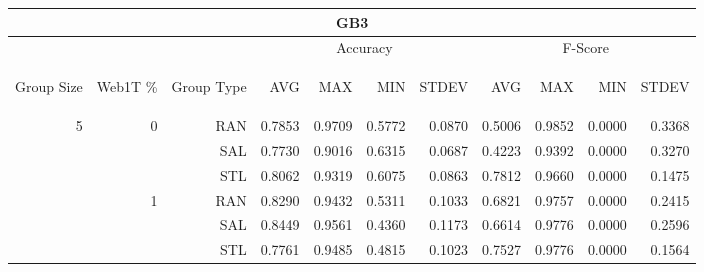 \begin{center}
\begin{table}[htbp] 
 \begin{center}
\begin{tabular}{ | r | r | r | r | r | r | r | r | r | r | r |}
\hline
\multicolumn{11}{|c|}{GB3}\\
\hline
 & & & \multicolumn{4}{|c|}{Accuracy} & \multicolumn{4}{|c|}{F-Score}\\ \cline{4-11}
\begin{sideways}Group Size\end{sideways} & \begin{sideways}Web1T \%\end{sideways} & \begin{sideways}Group Type\end{sideways} & \begin{sideways}AVG\end{sideways} & \begin{sideways}MAX\end{sideways} & \begin{sideways}MIN\end{sideways} & \begin{sideways}STDEV\end{sideways} & \begin{sideways}AVG\end{sideways} & \begin{sideways}MAX\end{sideways} & \begin{sideways}MIN\end{sideways} & \begin{sideways}STDEV\end{sideways}\\
\hline
\multirow{18}{*}{5}
 & \multirow{3}{*}{0} & RAN & 0.7853 & 0.9709 & 0.5772 & 0.0870 & 0.5006 & 0.9852 & 0.0000 & 0.3368\\ \cline{3-11}
 &   & SAL & 0.7730 & 0.9016 & 0.6315 & 0.0687 & 0.4223 & 0.9392 & 0.0000 & 0.3270\\ \cline{3-11}
 &   & STL & 0.8062 & 0.9319 & 0.6075 & 0.0863 & 0.7812 & 0.9660 & 0.0000 & 0.1475\\ \cline{2-11}
 & \multirow{3}{*}{1} & RAN & 0.8290 & 0.9432 & 0.5311 & 0.1033 & 0.6821 & 0.9757 & 0.0000 & 0.2415\\ \cline{3-11}
 &   & SAL & 0.8449 & 0.9561 & 0.4360 & 0.1173 & 0.6614 & 0.9776 & 0.0000 & 0.2596\\ \cline{3-11}
 &   & STL & 0.7761 & 0.9485 & 0.4815 & 0.1023 & 0.7527 & 0.9776 & 0.0000 & 0.1564\\ \cline{2-11}

\end{tabular}
\end{center}
\end{table}
\end{center}
